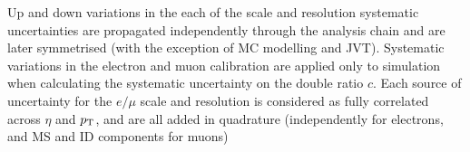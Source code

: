 %
 Up and down variations in the each of the scale and resolution systematic uncertainties are propagated independently through the analysis chain and are later symmetrised (with the exception of MC modelling and JVT). Systematic variations in the electron and muon calibration are applied only to simulation when calculating the systematic uncertainty on the double ratio $c$. Each source of uncertainty for the $e/\mu$ scale and resolution is considered as fully correlated across $\eta$ and $p_{\text{T}}$, and are all added in quadrature (independently for electrons, and MS and ID components for muons)

